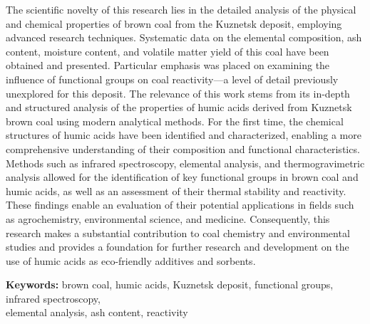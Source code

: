 The scientific novelty of this research lies in the detailed analysis of
the physical and chemical properties of brown coal from the Kuznetsk
deposit, employing advanced research techniques. Systematic data on the
elemental composition, ash content, moisture content, and volatile
matter yield of this coal have been obtained and presented. Particular
emphasis was placed on examining the influence of functional groups on
coal reactivity---a level of detail previously unexplored for this
deposit. The relevance of this work stems from its in-depth and
structured analysis of the properties of humic acids derived from
Kuznetsk brown coal using modern analytical methods. For the first time,
the chemical structures of humic acids have been identified and
characterized, enabling a more comprehensive understanding of their
composition and functional characteristics. Methods such as infrared
spectroscopy, elemental analysis, and thermogravimetric analysis allowed
for the identification of key functional groups in brown coal and humic
acids, as well as an assessment of their thermal stability and
reactivity. These findings enable an evaluation of their potential
applications in fields such as agrochemistry, environmental science, and
medicine. Consequently, this research makes a substantial contribution
to coal chemistry and environmental studies and provides a foundation
for further research and development on the use of humic acids as
eco-friendly additives and sorbents.

{\bfseries Keywords:} brown coal, humic acids, Kuznetsk deposit, functional
groups, infrared spectroscopy, \\elemental analysis, ash content,
reactivity

